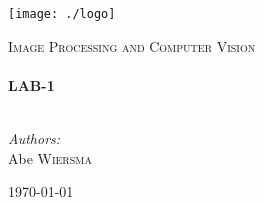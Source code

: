 \begin{titlepage}

\begin{flushleft}
\texttt{[image: ./logo]}\\[1cm] \end{flushleft}
\begin{center}
	\textsc{\Large Image Processing and Computer Vision}\\[0.5cm]

    \HRule \\[0.4cm] { \huge \bfseries LAB-1}\\[0.4cm]

    \HRule \\[1.5cm]

\begin{minipage}{0.4\textwidth}
\begin{flushleft} \large \emph{Authors:}\\
Abe \textsc{Wiersma}\\
\end{flushleft}
\end{minipage}
\begin{minipage}{0.4\textwidth} \begin{flushright} \large \end{flushright}\end{minipage}

    \vfill

    {\large \today}

\end{center}
\end{titlepage}
\pagebreak
